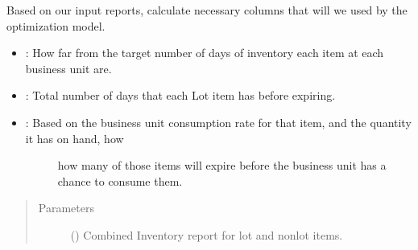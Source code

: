\documentclass[letterpaper,10pt,english]{sphinxmanual}
\begin{document}
\begin{fulllineitems}
\label{\detokenize{source/optimization.datatools:optimization.datatools.pipelines.active_status}}
\end{fulllineitems}


\begin{fulllineitems}
\label{\detokenize{source/optimization.datatools:optimization.datatools.pipelines.calculations_pipeline}}
Based on our input reports, calculate necessary columns that will we used by the optimization model.

\begin{itemize}
\item {} 
: How far from the target number of days of inventory each item at each business unit are.

\item {} 
: Total number of days that each Lot item has before expiring.

\item {} \begin{description}
\item[{: Based on the business unit consumption rate for that item, and the quantity it has on hand, how}] \leavevmode
how many of those items will expire before the business unit has a chance to consume them.

\end{description}

\end{itemize}
\begin{quote}\begin{description}
\item[{Parameters}] \leavevmode
{} () \textendash{} Combined Inventory report for lot and non\sphinxhyphen{}lot items.


\end{description}
\end{quote}
\end{fulllineitems}
\end{document}
